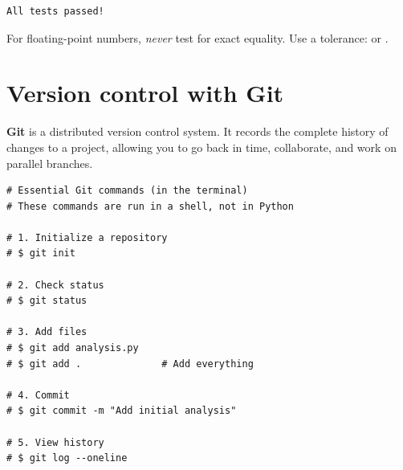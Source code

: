 \begin{codeoutput}
\begin{verbatim}
All tests passed!
\end{verbatim}
\end{codeoutput}

\begin{warning}
For floating-point numbers, \emph{never} test for exact equality.
Use a tolerance:  or
.
\end{warning}

\section{Version control with Git}

\begin{definition}[Git]
\textbf{Git} is a distributed version control system. It records
the complete history of changes to a project, allowing you to go back
in time, collaborate, and work on parallel branches.
\end{definition}

\begin{center}
\end{center}

\begin{codeblock}[title=\textbf{Python}]
\begin{verbatim}
# Essential Git commands (in the terminal)
# These commands are run in a shell, not in Python

# 1. Initialize a repository
# $ git init

# 2. Check status
# $ git status

# 3. Add files
# $ git add analysis.py
# $ git add .              # Add everything

# 4. Commit
# $ git commit -m "Add initial analysis"

# 5. View history
# $ git log --oneline
\end{verbatim}
\end{codeblock}

